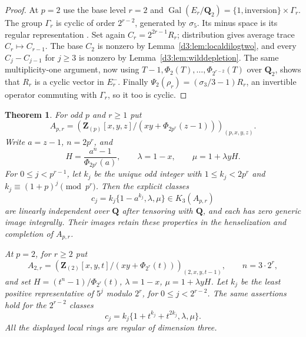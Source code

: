 \documentclass[11pt,a4paper]{amsart}
\numberwithin{equation}{section}
\newtheorem{theorem}{Theorem}[section]
\theoremstyle{definition}
\theoremstyle{remark}
\newcommand{\Q}{\mathbf Q}
\newcommand{\Z}{\mathbf Z}
\newcommand{\Gal}{\operatorname{Gal}}
\begin{document}
\begin{proof}
At $p=2$ use the base level $r=2$ and
$\Gal(E_r/\Q_2)=\{1,\text{inversion}\}\times\Gamma_r$.
The group $\Gamma_r$ is cyclic of order $2^{r-2}$, generated by
$\sigma_5$. Its minus space is its regular representation
\cite[Chapter~I, p.~34]{MilneDuality}.
Set again $C_r=2^{2r-1}R_r$; distribution gives average trace
$C_r\mapsto C_{r-1}$. The base $C_2$ is nonzero by
Lemma~\ref{d3:lem:localdilogtwo}, and every
$C_j-C_{j-1}$ for $j\geq3$ is nonzero by
Lemma~\ref{d3:lem:wilddepletion}.
The same multiplicity-one argument, now using
$T-1,\Phi_2(T),\ldots,\Phi_{2^{r-2}}(T)$ over $\Q_2$,
shows that $R_r$ is a cyclic vector in $E_r^-$.
Finally $\Psi_2(\rho_r)=(\sigma_3/3-1)R_r$, an invertible
operator commuting with $\Gamma_r$, so it too is cyclic.
\end{proof}

\begin{theorem}
\label{d3:thm:explicitwildtriples}
For odd $p$ and $r\geq1$ put
\[
 A_{p,r}=\left(\Z_{(p)}[x,y,z]/
       (xy+\Phi_{2p^r}(z-1))\right)_{(p,x,y,z)}.
\]
Write $a=z-1$, $n=2p^r$, and
\[
 H=\frac{a^n-1}{\Phi_{2p^r}(a)},\qquad
 \lambda=1-x,\qquad \mu=1+\lambda yH.
\]
For $0\leq j<p^{r-1}$, let $k_j$ be the unique odd integer with $1\leq k_j<2p^r$ and
$k_j\equiv(1+p)^j\pmod{p^r}$.
Then the explicit classes
\[
 c_j=k_j\{1-a^{k_j},\lambda,\mu\}\in K_3(A_{p,r})
\]
are linearly independent over $\Q$ after tensoring with $\Q$,
and each has zero generic image integrally.
Their images retain these properties in the henselization and
completion of $A_{p,r}$.

At $p=2$, for $r\geq2$ put
\[
 A_{2,r}=\left(\Z_{(2)}[x,y,t]/
                 (xy+\Phi_{2^r}(t))\right)_{(2,x,y,t-1)},
 \qquad n=3\cdot2^r,
\]
and set $H=(t^n-1)/\Phi_{2^r}(t)$,
$\lambda=1-x$, $\mu=1+\lambda yH$.
Let $k_j$ be the least positive representative of $5^j$ modulo
$2^r$, for $0\leq j<2^{r-2}$.
The same assertions hold for the $2^{r-2}$ classes
\[
 c_j=k_j\{1+t^{k_j}+t^{2k_j},\lambda,\mu\}.
\]
All the displayed local rings are regular of dimension three.
\end{theorem}
\end{document}
